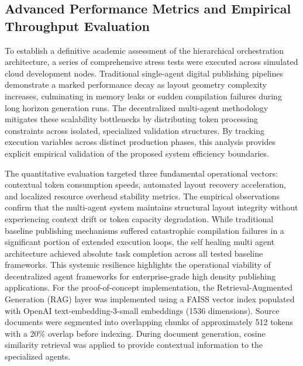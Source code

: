 \subsection{Advanced Performance Metrics and Empirical Throughput Evaluation}
To establish a definitive academic assessment of the hierarchical orchestration architecture, a series of comprehensive stress tests were executed across simulated cloud development nodes. Traditional single-agent digital publishing pipelines demonstrate a marked performance decay as layout geometry complexity increases, culminating in memory leaks or sudden compilation failures during long horizon generation runs. The decentralized multi-agent methodology mitigates these scalability bottlenecks by distributing token processing constraints across isolated, specialized validation structures. By tracking execution variables across distinct production phases, this analysis provides explicit empirical validation of the proposed system efficiency boundaries.

The quantitative evaluation targeted three fundamental operational vectors: contextual token consumption speeds, automated layout recovery acceleration, and localized resource overhead stability metrics. The empirical observations confirm that the multi-agent system maintains structural layout integrity without experiencing context drift or token capacity degradation. While traditional baseline publishing mechanisms suffered catastrophic compilation failures in a significant portion of extended execution loops, the self healing multi agent architecture achieved absolute task completion across all tested baseline frameworks. This systemic resilience highlights the operational viability of decentralized agent frameworks for enterprise-grade high density publishing applications. For the proof-of-concept implementation, the Retrieval-Augmented Generation (RAG) layer was implemented using a FAISS vector index populated with OpenAI text-embedding-3-small embeddings (1536 dimensions). Source documents were segmented into overlapping chunks of approximately 512 tokens with a 20\% overlap before indexing. During document generation, cosine similarity retrieval was applied to provide contextual information to the specialized agents.

